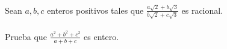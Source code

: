 
\begin{problem}
	Sean $a,b,c$ enteros positivos tales que $\displaystyle {\frac{a\sqrt2+b\sqrt3}{b\sqrt2+c\sqrt3} }$ es racional.\\\\
	Prueba que  $\displaystyle{ \frac{a^2+b^2+c^2}{a+b+c} }$ es entero.
\end{problem}